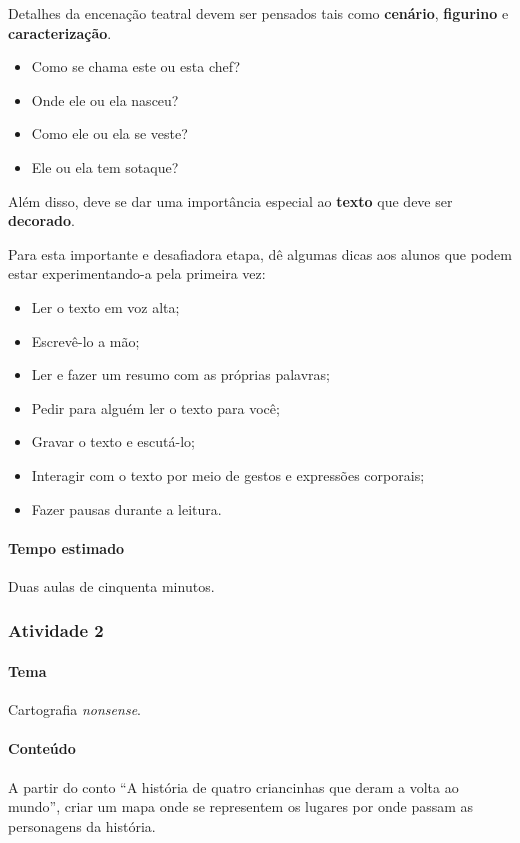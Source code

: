 \documentclass[11pt]{extarticle}
\begin{document}
Detalhes da encenação teatral devem ser pensados tais como \textbf{cenário},
\textbf{figurino} e \textbf{caracterização}. 

\begin{itemize}
	\item Como se chama este ou esta chef?
	\item Onde ele ou ela nasceu?
	\item Como ele ou ela se veste?
	\item Ele ou ela tem sotaque? 
\end{itemize}

Além disso, deve se dar uma importância especial ao \textbf{texto} que deve
ser \textbf{decorado}. 

Para esta importante e desafiadora etapa, dê algumas dicas aos alunos
que podem estar experimentando-a pela primeira vez:

\begin{itemize}
	\item Ler o texto em voz alta;
	\item Escrevê-lo a mão;
	\item Ler e fazer um resumo com as próprias palavras;
	\item Pedir para alguém ler o texto para você;
	\item Gravar o texto e escutá-lo;
	\item Interagir com o texto por meio de gestos e expressões corporais;
	\item Fazer pausas durante a leitura.
\end{itemize}

\paragraph{Tempo estimado} Duas aulas de cinquenta minutos.

\subsubsection{Atividade 2}


\paragraph{Tema} Cartografia \emph{nonsense}.

\paragraph{Conteúdo} A partir do conto ``A história de quatro criancinhas que deram a volta ao mundo'',
criar um mapa onde se representem os lugares por onde passam as personagens da história.
\end{document}
